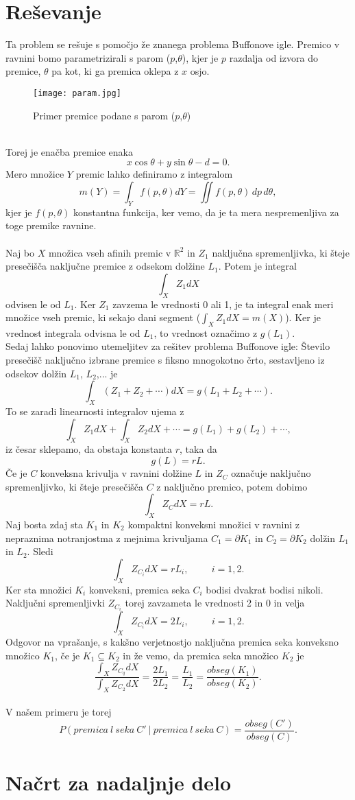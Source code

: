 \documentclass[a4paper,12pt]{article}
\begin{document}
\section{Reševanje}
Ta problem se rešuje s pomočjo že znanega problema Buffonove igle. Premico v ravnini bomo parametrizirali s parom ($p$,$\theta$), kjer je $p$ razdalja od izvora do premice, $\theta$ pa kot, ki ga premica oklepa z $x$ osjo. 
\begin{figure}[h!]
	\begin{center}
		\texttt{[image: param.jpg]}
            \caption{Primer premice podane s parom ($p$,$\theta$)}
	\end{center}
\end{figure}
\\
Torej je enačba premice enaka $$x\cos{\theta}+y\sin{\theta}-d=0.$$
Mero množice $Y$ premic lahko definiramo z integralom $$m(Y)=\int_{Y} f(p,\theta) dY=\iint f(p,\theta)\,dp\,d\theta,$$kjer je $f(p,\theta)$ konstantna funkcija, ker vemo, da je ta mera nespremenljiva za toge premike ravnine.\\
\\
Naj bo $X$ množica vseh afinih premic v $\mathbb{R}^2$ in $Z_1$ naključna spremenljivka, ki šteje presečišča naključne premice z odsekom dolžine $L_1$. Potem je integral $$\int_{X} Z_1 dX $$ odvisen le od $L_1$. Ker $Z_1$ zavzema le vrednosti 0 ali 1, je ta integral enak meri množice vseh
premic, ki sekajo dani segment ($\int_{X} Z_1 dX=m(X)$). Ker je vrednost integrala odvisna le od $L_1$, to vrednost označimo z $g(L_1).$ \\
Sedaj lahko ponovimo utemeljitev za rešitev problema Buffonove igle: Število presečišč naključno izbrane premice s fiksno mnogokotno črto, sestavljeno iz odsekov dolžin $L_1$, $L_2$,... je
$$\int_{X} (Z_1+Z_2+\cdots) dX=g(L_1+L_2+\cdots).$$
To se zaradi linearnosti integralov ujema z 
$$\int_{X} Z_1 dX + \int_{X} Z_2 dX+\cdots=g(L_1)+g(L_2)+\cdots,$$
iz česar sklepamo, da obstaja konstanta $r$, taka da $$g(L)=rL.$$
Če je $C$ konveksna krivulja v ravnini dolžine $L$ in $Z_C$ označuje naključno spremenljivko, ki šteje presečišča $C$ z naključno premico, potem dobimo $$\int_{X} Z_C dX=rL.$$
Naj bosta zdaj sta $K_1$ in $K_2$ kompaktni konveksni množici v ravnini z nepraznima notranjostma z mejnima krivuljama $C_1 =\partial K_1$ in $C_2 =\partial K_2$ dolžin $L_1$ in $L_2$. Sledi $$\int_{X} Z_{C_i} dX=rL_i,\hspace{1cm} i=1,2.$$
Ker sta množici $K_i$ konveksni, premica seka $C_i$ bodisi dvakrat bodisi nikoli. Naključni spremenljivki $Z_{C_i}$ torej zavzameta le vrednosti 2 in 0 in velja  $$\int_{X} Z_{C_i} dX=2L_i,\hspace{1cm} i=1,2.$$
Odgovor na vprašanje, s kakšno verjetnostjo naključna premica seka konveksno množico $K_1$, če je $K_1 \subseteq K_2$ in že vemo, da premica seka množico $K_2$ je $$\frac{\int_{X} Z_{C_q} dX}{\int_{X} Z_{C_2} dX}=\frac{2L_1}{2L_2}=\frac{L_1}{L_2}=\frac{obseg(K_1)}{obseg(K_2)}.$$
\\
V našem primeru je torej 
$$P(premica\ l\ seka\ C'\ |\ premica\ l\ seka\ C)=\frac{obseg(C')}{obseg(C)}.$$
\section{Načrt za nadaljnje delo}
\end{document}
